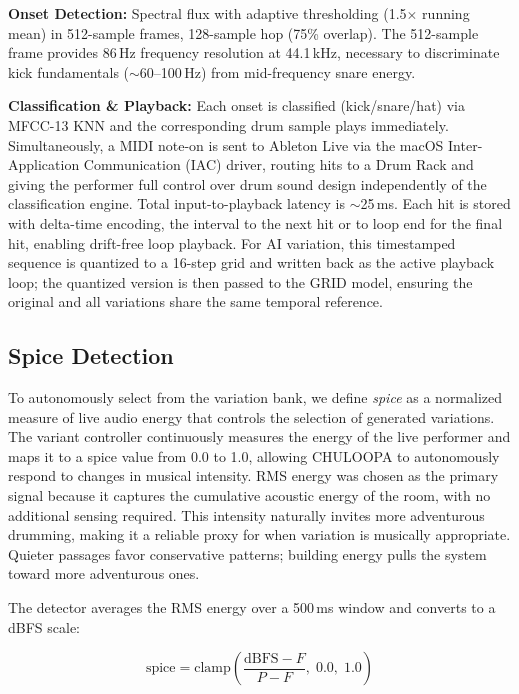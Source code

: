 \documentclass{aimc2026}
\begin{document}
\textbf{Onset Detection:} Spectral flux with adaptive thresholding (1.5$\times$ running mean) in 512-sample frames, 128-sample hop (75\% overlap). The 512-sample frame provides 86\,Hz frequency resolution at 44.1\,kHz, necessary to discriminate kick fundamentals ($\sim$60--100\,Hz) from mid-frequency snare energy.

\textbf{Classification \& Playback:} Each onset is classified (kick/snare/hat) via MFCC-13 KNN and the corresponding drum sample plays immediately. Simultaneously, a MIDI note-on is sent to Ableton Live via the macOS Inter-Application Communication (IAC) driver, routing hits to a Drum Rack and giving the performer full control over drum sound design independently of the classification engine. Total input-to-playback latency is $\sim$25\,ms. Each hit is stored with delta-time encoding, the interval to the next hit or to loop end for the final hit, enabling drift-free loop playback. For AI variation, this timestamped sequence is quantized to a 16-step grid and written back as the active playback loop; the quantized version is then passed to the GRID model, ensuring the original and all variations share the same temporal reference.

\subsection{Spice Detection}

To autonomously select from the variation bank, we define \emph{spice} as a normalized measure of live audio energy that controls the selection of generated variations. The variant controller continuously measures the energy of the live performer and maps it to a spice value from 0.0 to 1.0, allowing CHULOOPA to autonomously respond to changes in musical intensity. RMS energy was chosen as the primary signal because it captures the cumulative acoustic energy of the room, with no additional sensing required. This intensity naturally invites more adventurous drumming, making it a reliable proxy for when variation is musically appropriate. Quieter passages favor conservative patterns; building energy pulls the system toward more adventurous ones.

The detector averages the RMS energy over a 500\,ms window and converts to a dBFS scale:

\begin{equation}
\text{spice} = \text{clamp}\!\left(\frac{\text{dBFS} - F}{P - F},\; 0.0,\; 1.0\right)
\label{eq:spice}
\end{equation}
\end{document}
